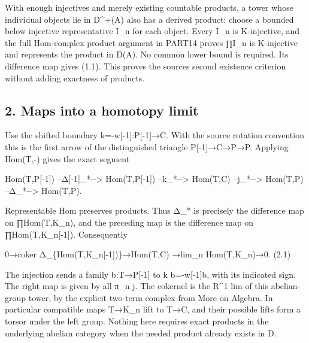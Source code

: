 With enough injectives and merely existing countable products,\allowbreak{} a tower whose individual objects lie in D\textasciicircum{}\allowbreak{}+(A)\allowbreak{} also has a derived product:\allowbreak{} choose a bounded below injective representative I\_\allowbreak{}n for each object. Every I\_\allowbreak{}n is K-injective,\allowbreak{} and the full Hom-complex product argument in PART14 proves ∏I\_\allowbreak{}n is K-injective and represents the product in D(A)\allowbreak{}. No common lower bound is required. Its difference map gives (1.1)\allowbreak{}. This proves the source\textquotesingle s second existence criterion without adding exactness of products.

\subsection{2. Maps into a homotopy limit}\label{proofs-10435-10686-maps-into-a-homotopy-limit}

Use the shifted boundary k\allowbreak{}=-w[-1]\allowbreak{}:\allowbreak{}P[-1]\allowbreak{}\allowbreak{}→C. With the source rotation convention this is the first arrow of the distinguished triangle P[-1]\allowbreak{}\allowbreak{}→C\allowbreak{}→P\allowbreak{}→P. Applying Hom(T,\allowbreak{}-)\allowbreak{} gives the exact segment

Hom(T,\allowbreak{}P[-1]\allowbreak{})\allowbreak{} --Δ[-1]\allowbreak{}\_\allowbreak{}*-\allowbreak{}-> Hom(T,\allowbreak{}P[-1]\allowbreak{})\allowbreak{} --k\_\allowbreak{}*-\allowbreak{}-> Hom(T,\allowbreak{}C)\allowbreak{} --j\_\allowbreak{}*-\allowbreak{}-> Hom(T,\allowbreak{}P)\allowbreak{} --Δ\_\allowbreak{}*-\allowbreak{}-> Hom(T,\allowbreak{}P)\allowbreak{}.

Representable Hom preserves products. Thus Δ\_\allowbreak{}* is precisely the difference map on ∏Hom(T,\allowbreak{}K\_\allowbreak{}n)\allowbreak{},\allowbreak{} and the preceding map is the difference map on ∏Hom(T,\allowbreak{}K\_\allowbreak{}n[-1]\allowbreak{})\allowbreak{}. Consequently

0\allowbreak{}→coker Δ\_\allowbreak{}\{Hom(T,\allowbreak{}K\_\allowbreak{}n[-1]\allowbreak{})\allowbreak{}\}\allowbreak{}→Hom(T,\allowbreak{}C)\allowbreak{} \allowbreak{}→lim\_\allowbreak{}n Hom(T,\allowbreak{}K\_\allowbreak{}n)\allowbreak{}\allowbreak{}→0. (2.1)\allowbreak{}

The injection sends a family b:\allowbreak{}T\allowbreak{}→P[-1]\allowbreak{} to k b\allowbreak{}=-w[-1]\allowbreak{}b,\allowbreak{} with its indicated sign. The right map is given by all π\_\allowbreak{}n j. The cokernel is the R\^{}1 lim of this abelian-group tower,\allowbreak{} by the explicit two-term complex from More on Algebra. In particular compatible maps T\allowbreak{}→K\_\allowbreak{}n lift to T\allowbreak{}→C,\allowbreak{} and their possible lifts form a torsor under the left group. Nothing here requires exact products in the underlying abelian category when the needed product already exists in D.

